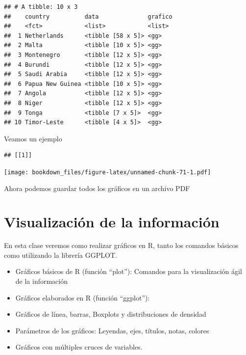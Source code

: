 \documentclass[]{book}
\newenvironment{Shaded}{\begin{snugshade}}{\end{snugshade}}
\newcommand{\DecValTok}[1]{\textcolor[rgb]{0.00,0.00,0.81}{#1}}
\newcommand{\KeywordTok}[1]{\textcolor[rgb]{0.13,0.29,0.53}{\textbf{#1}}}
\newcommand{\NormalTok}[1]{#1}
\newcommand{\OperatorTok}[1]{\textcolor[rgb]{0.81,0.36,0.00}{\textbf{#1}}}
\newcommand{\StringTok}[1]{\textcolor[rgb]{0.31,0.60,0.02}{#1}}
\providecommand{\tightlist}{%
  \setlength{\itemsep}{0pt}\setlength{\parskip}{0pt}}
\begin{document}
\begin{verbatim}
## # A tibble: 10 x 3
##    country          data              grafico
##    <fct>            <list>            <list> 
##  1 Netherlands      <tibble [58 x 5]> <gg>   
##  2 Malta            <tibble [10 x 5]> <gg>   
##  3 Montenegro       <tibble [12 x 5]> <gg>   
##  4 Burundi          <tibble [12 x 5]> <gg>   
##  5 Saudi Arabia     <tibble [12 x 5]> <gg>   
##  6 Papua New Guinea <tibble [10 x 5]> <gg>   
##  7 Angola           <tibble [12 x 5]> <gg>   
##  8 Niger            <tibble [12 x 5]> <gg>   
##  9 Tonga            <tibble [7 x 5]>  <gg>   
## 10 Timor-Leste      <tibble [4 x 5]>  <gg>
\end{verbatim}

Veamos un ejemplo

\begin{Shaded}
\end{Shaded}

\begin{verbatim}
## [[1]]
\end{verbatim}

\texttt{[image: bookdown\_files/figure-latex/unnamed-chunk-71-1.pdf]}

Ahora podemos guardar todos los gráficos en un archivo PDF

\begin{Shaded}
\end{Shaded}

\hypertarget{visualizacion-de-la-informacion}{%
\chapter{Visualización de la información}\label{visualizacion-de-la-informacion}}

En esta clase veremos como realizar gráficos en R, tanto los comandos básicos como utilizando la librería GGPLOT.

\begin{itemize}
\tightlist
\item
  Gráficos básicos de R (función ``plot''): Comandos para la visualización ágil de la información
\item
  Gráficos elaborados en R (función ``ggplot''):
\item
  Gráficos de línea, barras, Boxplots y distribuciones de densidad
\item
  Parámetros de los gráficos: Leyendas, ejes, títulos, notas, colores
\item
  Gráficos con múltiples cruces de variables.
\end{itemize}
\end{document}
